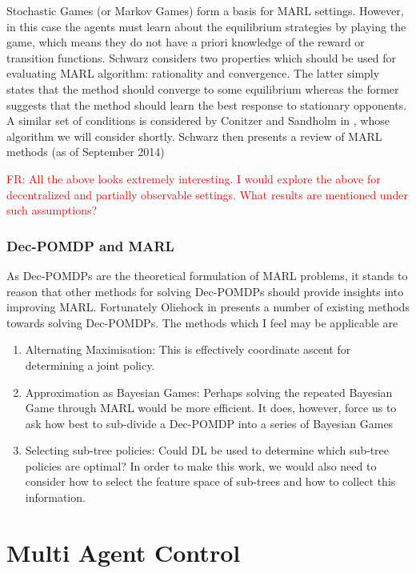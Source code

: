\documentclass[preprint,11pt]{report}
\newcommand\fr[1]{\textcolor{red}{FR: #1}}
\begin{document}
Stochastic Games (or Markov Games) form a basis for MARL
settings. However, in this case the agents must learn about the
equilibrium strategies by playing the game, which means they do not
have a priori knowledge of the reward or transition functions. Schwarz
considers two properties which should be used for evaluating MARL
algorithm: rationality and convergence. The latter simply states that
the method should converge to some equilibrium whereas the former
suggests that the method should learn the best response to stationary
opponents. A similar set of conditions is considered by Conitzer and
Sandholm in \cite{ConitzerAWESOME:}, whose algorithm we will consider
shortly. Schwarz then presents a review of MARL methods (as of
September 2014)

\fr{All the above looks extremely interesting. I would explore the
  above for decentralized and partially observable settings. What
  results are mentioned \cite{SchwartzMulti-agentApproach} under such
  assumptions?}

\subsection*{Dec-POMDP and MARL}

As Dec-POMDPs are the theoretical formulation of MARL problems, it stands to reason that other
methods for solving Dec-POMDPs should provide insights into improving MARL. Fortunately Oliehock in
\cite{OliehoekDecentralizedPOMDPs} presents a number of existing methods towards solving Dec-POMDPs.
The methods which I feel may be applicable are  \begin{enumerate} \item Alternating Maximisation: This
is effectively coordinate ascent for determining a joint policy. \item Approximation as Bayesian
Games: Perhaps solving the repeated Bayesian Game through MARL would be more efficient. It does,
however, force us to ask how best to sub-divide a Dec-POMDP into a series of Bayesian Games  \item
Selecting sub-tree policies: Could DL be used to determine which sub-tree policies are optimal? In
order to make this work, we would also need to consider how to select the feature space of sub-trees
and how to collect this information. \end{enumerate}

\chapter{Multi Agent Control}
\end{document}
